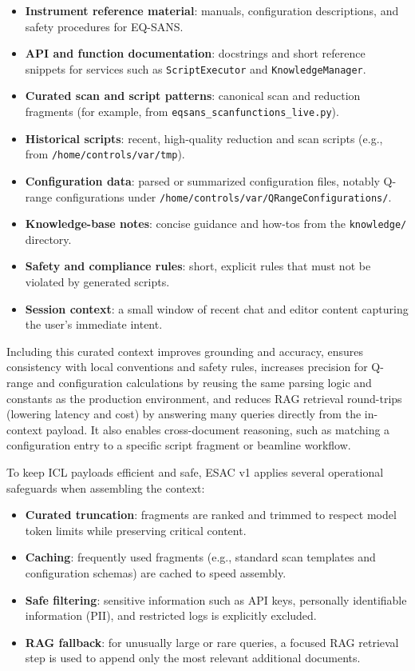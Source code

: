 \documentclass[tm]{ornltm} %
\begin{document}
\begin{itemize}
  \item \textbf{Instrument reference material}: manuals, configuration descriptions, and safety procedures for EQ-SANS.
  \item \textbf{API and function documentation}: docstrings and short reference snippets for services such as \texttt{ScriptExecutor} and \texttt{KnowledgeManager}.
  \item \textbf{Curated scan and script patterns}: canonical scan and reduction fragments (for example, from \texttt{eqsans\_scanfunctions\_live.py}).
  \item \textbf{Historical scripts}: recent, high-quality reduction and scan scripts (e.g., from \texttt{/home/controls/var/tmp}).
  \item \textbf{Configuration data}: parsed or summarized configuration files, notably Q-range configurations under \texttt{/home/controls/var/QRangeConfigurations/}.
  \item \textbf{Knowledge-base notes}: concise guidance and how-tos from the \texttt{knowledge/} directory.
  \item \textbf{Safety and compliance rules}: short, explicit rules that must not be violated by generated scripts.
  \item \textbf{Session context}: a small window of recent chat and editor content capturing the user's immediate intent.
\end{itemize}

Including this curated context improves grounding and accuracy, ensures consistency with local conventions and safety rules, increases precision for Q-range and configuration calculations by reusing the same parsing logic and constants as the production environment, and reduces RAG retrieval round-trips (lowering latency and cost) by answering many queries directly from the in-context payload. It also enables cross-document reasoning, such as matching a configuration entry to a specific script fragment or beamline workflow.

To keep ICL payloads efficient and safe, ESAC v1 applies several operational safeguards when assembling the context:

\begin{itemize}
  \item \textbf{Curated truncation}: fragments are ranked and trimmed to respect model token limits while preserving critical content.
  \item \textbf{Caching}: frequently used fragments (e.g., standard scan templates and configuration schemas) are cached to speed assembly.
  \item \textbf{Safe filtering}: sensitive information such as API keys, personally identifiable information (PII), and restricted logs is explicitly excluded.
  \item \textbf{RAG fallback}: for unusually large or rare queries, a focused RAG retrieval step is used to append only the most relevant additional documents.
\end{itemize}
\end{document}
